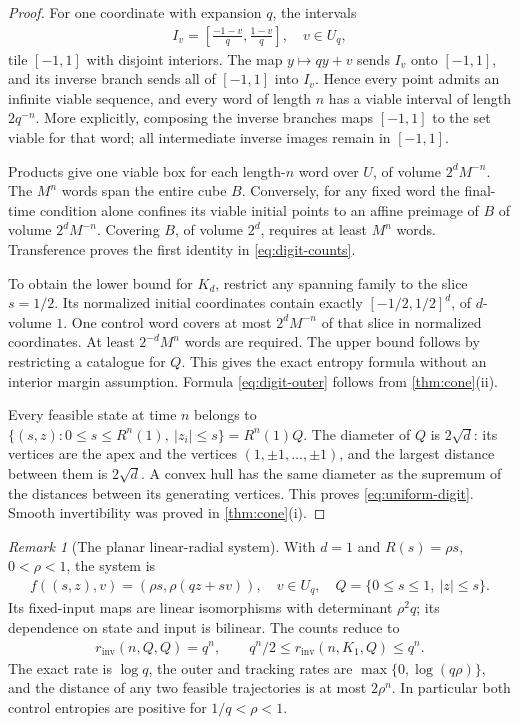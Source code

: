 \documentclass[11pt,a4paper]{article}
\theoremstyle{definition}
\theoremstyle{remark}
\newtheorem{remark}[theorem]{Remark}
\begin{document}
\begin{proof}
For one coordinate with expansion \(q\), the intervals
\begin{align*}
 I_v=\left[\frac{-1-v}{q},\frac{1-v}{q}\right],
       \quad v\in U_q,
\end{align*}
tile \([-1,1]\) with disjoint interiors. The map \(y\mapsto qy+v\) sends \(I_v\) onto \([-1,1]\), and its inverse branch sends all of \([-1,1]\) into \(I_v\). Hence every point admits an infinite viable sequence, and every word of length \(n\) has a viable interval of length \(2q^{-n}\). More explicitly, composing the inverse branches maps \([-1,1]\) to the set viable for that word; all intermediate inverse images remain in \([-1,1]\).

Products give one viable box for each length-\(n\) word over \(U\), of volume \(2^dM^{-n}\). The \(M^n\) words span the entire cube \(B\). Conversely, for any fixed word the final-time condition alone confines its viable initial points to an affine preimage of \(B\) of volume \(2^dM^{-n}\). Covering \(B\), of volume \(2^d\), requires at least \(M^n\) words. Transference proves the first identity in \eqref{eq:digit-counts}.

To obtain the lower bound for \(K_d\), restrict any spanning family to the slice \(s=1/2\). Its normalized initial coordinates contain exactly \([-1/2,1/2]^d\), of \(d\)-volume \(1\). One control word covers at most \(2^dM^{-n}\) of that slice in normalized coordinates. At least \(2^{-d}M^n\) words are required. The upper bound follows by restricting a catalogue for \(Q\). This gives the exact entropy formula without an interior margin assumption. Formula \eqref{eq:digit-outer} follows from \cref{thm:cone}(ii).

Every feasible state at time \(n\) belongs to
\(\{(s,z):0\leq s\leq R^n(1),\ |z_i|\leq s\}=R^n(1)Q\).
The diameter of \(Q\) is \(2\sqrt d\): its vertices are the apex and the vertices \((1,\pm1,\ldots,\pm1)\), and the largest distance between them is \(2\sqrt d\). A convex hull has the same diameter as the supremum of the distances between its generating vertices. This proves \eqref{eq:uniform-digit}. Smooth invertibility was proved in \cref{thm:cone}(i).
\end{proof}

\begin{remark}[The planar linear-radial system]
With \(d=1\) and \(R(s)=\rho s\), \(0<\rho<1\), the system is
\begin{align*}
 f((s,z),v)=(\rho s,\rho(qz+sv)),\quad v\in U_q,
 \quad Q=\{0\leq s\leq1,\ |z|\leq s\}.
\end{align*}
Its fixed-input maps are linear isomorphisms with determinant \(\rho^2q\); its dependence on state and input is bilinear. The counts reduce to
\begin{align*}
 r_{\mathrm{inv}}(n,Q,Q)=q^n,\qquad
 q^n/2\leq r_{\mathrm{inv}}(n,K_1,Q)\leq q^n.
\end{align*}
The exact rate is \(\log q\), the outer and tracking rates are \(\max\{0,\log(q\rho)\}\), and the distance of any two feasible trajectories is at most \(2\rho^n\). In particular both control entropies are positive for \(1/q<\rho<1\).
\end{remark}
\end{document}
